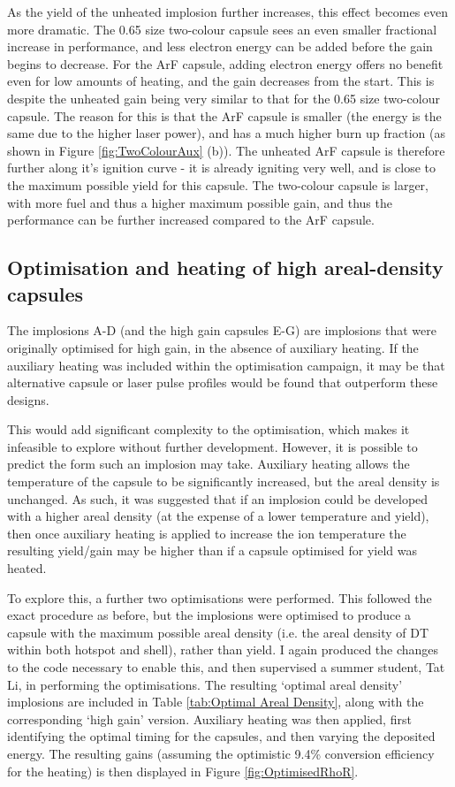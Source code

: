 As the yield of the unheated implosion further increases, this effect becomes even more dramatic. The 0.65 size two-colour capsule sees an even smaller fractional increase in performance, and less electron energy can be added before the gain begins to decrease. For the ArF capsule, adding electron energy offers no benefit even for low amounts of heating, and the gain decreases from the start. This is despite the unheated gain being very similar to that for the 0.65 size two-colour capsule. The reason for this is that the ArF capsule is smaller (the energy is the same due to the higher laser power), and has a much higher burn up fraction (as shown in Figure \ref{fig:TwoColourAux} (b)). The unheated ArF capsule is therefore further along it's ignition curve - it is already igniting very well, and is close to the maximum possible yield for this capsule. The two-colour capsule is larger, with more fuel and thus a higher maximum possible gain, and thus the performance can be further increased compared to the ArF capsule.

\subsection{Optimisation and heating of high areal-density capsules}
The implosions A-D (and the high gain capsules E-G) are implosions that were originally optimised for high gain, in the absence of auxiliary heating. If the auxiliary heating was included within the optimisation campaign, it may be that alternative capsule or laser pulse profiles would be found that outperform these designs.

This would add significant complexity to the optimisation, which makes it infeasible to explore without further development. However, it is possible to predict the form such an implosion may take. Auxiliary heating allows the temperature of the capsule to be significantly increased, but the areal density is unchanged. As such, it was suggested that if an implosion could be developed with a higher areal density (at the expense of a lower temperature and yield), then once auxiliary heating is applied to increase the ion temperature the resulting yield/gain may be higher than if a capsule optimised for yield was heated.

To explore this, a further two optimisations were performed. This followed the exact procedure as before, but the implosions were optimised to produce a capsule with the maximum possible areal density (i.e. the areal density of DT within both hotspot and shell), rather than yield. I again produced the changes to the code necessary to enable this, and then supervised a summer student, Tat Li, in performing the optimisations. The resulting `optimal areal density' implosions are included in Table \ref{tab:Optimal Areal Density}, along with the corresponding `high gain' version. Auxiliary heating was then applied, first identifying the optimal timing for the capsules, and then varying the deposited energy. The resulting gains (assuming the optimistic 9.4\% conversion efficiency for the heating) is then displayed in Figure \ref{fig:OptimisedRhoR}.


